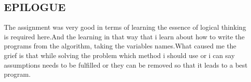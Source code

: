 \documentclass[11pt]{article}
\begin{document}
\newpage
\begin{center}
\section*{EPILOGUE}
\end{center}
\bigskip
\begin{flushleft}
The assignment was very good in terms of learning the essence of logical thinking is required here.And the learning in that way that i learn about how to write the programs from the algorithm, taking the variables names.What caused me the grief is that while solving the problem which method i should use or i can say assumptions needs to be fulfilled or they can be removed so that it leads to a best program. 
\end{flushleft}
\end{document}
